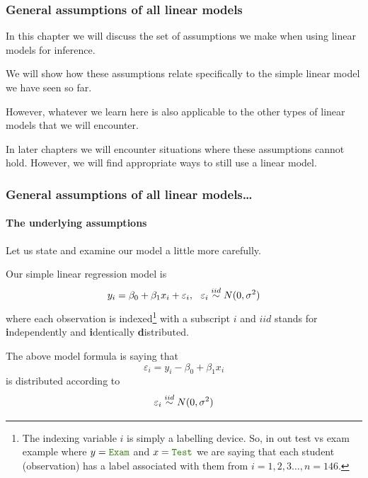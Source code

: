 \documentclass{beamer}\usepackage[]{graphicx}\usepackage[]{xcolor}
\begin{document}
\begin{frame}[fragile]
\frametitle{General assumptions of all linear models}

In this chapter we will discuss the set of assumptions we make when using linear models for inference. 

\medskip

We will show how these assumptions relate specifically to the simple linear model we have seen so far.

\medskip

However, whatever we learn here is also applicable to the other types of linear models that we will encounter.

\medskip

In later chapters we will encounter situations where these assumptions cannot hold. However, we will find appropriate ways to still use a linear model.

\end{frame}


\begin{frame}[fragile,t]
\frametitle{General assumptions of all linear models\ldots}
\framesubtitle{The underlying assumptions}
Let us state and examine our model a little more carefully.

Our simple linear regression model is
\[
y_i=\beta_0+\beta_1 x_i+\varepsilon_i, \ \ \varepsilon_i \iid N(0, \sigma^2)
\]
where each observation is indexed\footnote{The indexing variable $i$ is simply a labelling device. So, in out test vs exam example where $y=\rcode{Exam}$ and $x=\rcode{Test}$ we are saying that each student (observation) has a label associated with them from $i=1, 2, 3\ldots, n=146$.} with a subscript $i$ and $iid$ stands for  \textbf{i}ndependently and \textbf{i}dentically \textbf{d}istributed.

The above model formula is saying that
\[
\varepsilon_i = y_i - \beta_0+\beta_1 x_i 
\]
is distributed according to
\[
\varepsilon_i \stackrel{iid}{\sim} N(0, \sigma^2)
\]
\end{frame}
\end{document}
